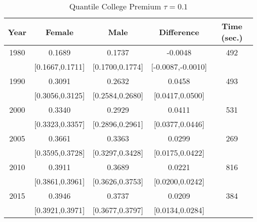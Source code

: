 \begin{table}[ht]
\centering
\begin{tabular}{ccccc}
  \hline
Year & Female & Male & Difference & Time (sec.) \\ 
  \hline
1980 & 0.1689 & 0.1737 & -0.0048 & 492 \\ 
   & [0.1667,0.1711] & [0.1700,0.1774] & [-0.0087,-0.0010] &  \\ 
  1990 & 0.3091 & 0.2632 & 0.0458 & 493 \\ 
   & [0.3056,0.3125] & [0.2584,0.2680] & [0.0417,0.0500] &  \\ 
  2000 & 0.3340 & 0.2929 & 0.0411 & 531 \\ 
   & [0.3323,0.3357] & [0.2896,0.2961] & [0.0377,0.0446] &  \\ 
  2005 & 0.3661 & 0.3363 & 0.0299 & 269 \\ 
   & [0.3595,0.3728] & [0.3297,0.3428] & [0.0175,0.0422] &  \\ 
  2010 & 0.3911 & 0.3689 & 0.0221 & 816 \\ 
   & [0.3861,0.3961] & [0.3626,0.3753] & [0.0200,0.0242] &  \\ 
  2015 & 0.3946 & 0.3737 & 0.0209 & 384 \\ 
   & [0.3921,0.3971] & [0.3677,0.3797] & [0.0134,0.0284] &  \\ 
   \hline
\end{tabular}
\caption{Quantile College Premium $\tau=0.1$} 
\end{table}
